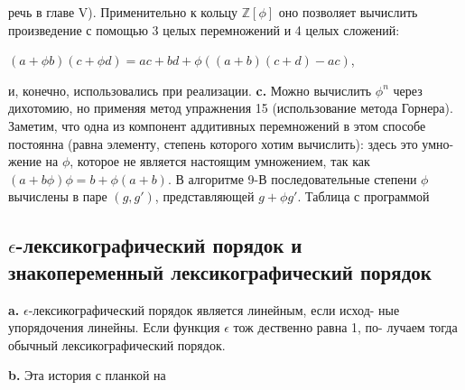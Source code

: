 \documentclass{mai_book}
\begin{document}
речь в главе V). Применительно к кольцу $\mathbb{Z}[\phi]$ оно позволяет вычислить
произведение с помощью 3 целых перемножений и 4 целых сложений:
\begin{center}
$(a+\phi b)(c+\phi d)=ac+bd+\phi((a+b)(c+d)-ac)$,
\end{center}
и, конечно, использовались при реализации.\newline
\hspace*{15pt}\textbf{c.} Можно вычислить $\phi^n$ через дихотомию, но применяя метод
упражнения 15 (использование метода Горнера). Заметим, что одна
из компонент аддитивных перемножений в этом способе постоянна
(равна элементу, степень которого хотим вычислить): здесь это умно-
жение на $\phi$, которое не является настоящим умножением, так как
$(a+b\phi)\phi=b+\phi(a+b)$. В алгоритме 9-В последовательные степени
$\phi$ вычислены в паре $(g,g')$, представляющей $g+\phi g'$.\newline
Таблица с программой
\newline
\subsection{$\epsilon$-лексикографический порядок и знакопеременный лексикографический порядок}
\hspace*{15pt}\textbf{a.} $\epsilon$-лексикографический порядок является линейным, если исход-
ные упорядочения линейны. Если функция $\epsilon$ тож дественно равна 1, по-
лучаем тогда обычный лексикографический порядок.
\newpage



\hspace*{15pt}\textbf{b.} Эта история с планкой на
\end{document}
